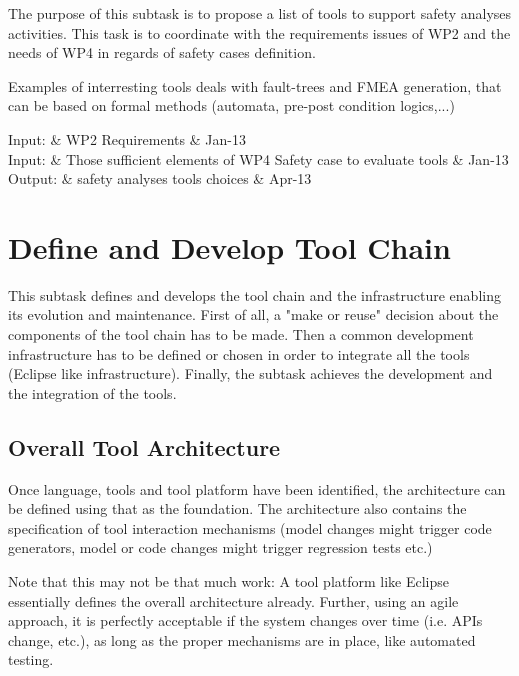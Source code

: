 \documentclass{template/openetcs_article}
\begin{document}
The purpose of this subtask is to propose a list of tools to  support  safety  analyses activities. This task  is to  coordinate with  the requirements issues of WP2 and the needs of WP4 in regards of safety cases definition.

Examples of interresting tools deals with fault-trees and FMEA generation, that can be based on formal methods (automata, pre-post condition logics,...) 
  
 
\begin{inoutput}
Input: & WP2 Requirements & Jan-13 \\
Input: & Those sufficient elements of WP4 Safety case to evaluate tools & Jan-13 \\
\hline
Output: & safety analyses tools choices & Apr-13 \\
\end{inoutput}



\section{Define and Develop Tool Chain}\label{sec:devtoolchain}


This subtask defines and develops the tool chain and the infrastructure enabling its evolution and maintenance. First of all, a "make or reuse" decision about the components of the tool chain has to be made. Then a common development infrastructure has to be defined or chosen in order to integrate all the tools (Eclipse like infrastructure). Finally, the subtask achieves the development and the integration of the tools.

\subsection{Overall Tool Architecture}

Once language, tools and tool platform have been identified, the architecture can be defined using that as the foundation.  The architecture also contains the specification of tool interaction mechanisms (model changes might trigger code generators, model or code changes might trigger regression tests etc.) 

Note that this may not be that much work:  A tool platform like Eclipse essentially defines the overall architecture already.  Further, using an agile approach, it is perfectly acceptable if the system changes over time (i.e. APIs change, etc.), as long as the proper mechanisms are in place, like automated testing.
\end{document}

